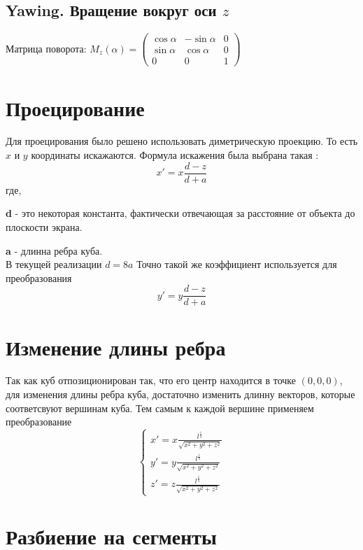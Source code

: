 \documentclass[a4paper,11pt]{article}
\begin{document}
  \subsection*{Yawing. Вращение вокруг оси $z$}
Матрица поворота:  $M_z(\alpha) =
\begin{pmatrix} 
\cos  \alpha  &  -\sin \alpha & 0 \\
\sin \alpha & \cos \alpha & 0 \\
   0          & 0           & 1
\end{pmatrix} $
  \section{Проецирование}
 Для проецирования было решено использовать диметрическую проекцию. То есть $x$ и $y$ координаты искажаются. Формула искажения была выбрана такая : 
\[  x' = x\frac{d-z}{d+a} \]
где, 


 
\textbf{d} - это некоторая константа, фактически отвечающая за расстояние от объекта до плоскости экрана. 



\textbf{a} - длинна ребра куба. 
\\
В текущей реализации $d = 8a$
Точно такой же коэффициент используется для преобразования 
\[  y' = y\frac{d-z}{d+a} \]
  
  \section{Изменение длины ребра}
  Так как куб отпозиционирован так, что его центр находится в точке $(0,0,0)$, 
  для изменения длины ребра куба, достаточно изменить длинну векторов, которые соответсвуют вершинам куба. Тем самым к каждой вершине применяем преобразование
  \linebreak
\[ 
\begin{cases}
   x' = x\frac{l^{\frac{1}{3}}}{\sqrt{x^2+y^2+z^2}} \\
   y' = y\frac{l^{\frac{1}{3}}}{\sqrt{x^2+y^2+z^2}} \\
   z' = z\frac{l^{\frac{1}{3}}}{\sqrt{x^2+y^2+z^2}}
\end{cases}
 \] 
  \section{Разбиение на сегменты}
 
\end{document}
